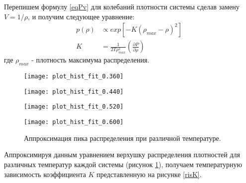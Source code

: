 Перепишем формулу \ref{eqPv} для колебаний плотности системы сделав замену $V = 1 / \rho$, и получим следующее уравнение:
\begin{equation}
\begin{aligned}
p(\rho) &\varpropto exp \left[ - K \left(\rho_{max}- \rho \right)^2 \right] \\
K &= \frac{1}{2T\rho_{max}^2} \left( \frac{\partial P}{\partial \rho} \right)
\end{aligned}
\label{eqFitRho}
\end{equation}
где $\rho_{max}$ - плотность максимума распределения.


\begin{figure}[htbp!]
\begin{center}
\begin{minipage}[h]{0.45\linewidth}
\texttt{[image: plot\_hist\_fit\_0.360]}
\end{minipage}
\begin{minipage}[h]{0.45\linewidth}
\texttt{[image: plot\_hist\_fit\_0.440]}
\end{minipage}

\begin{minipage}[h]{0.45\linewidth}
\texttt{[image: plot\_hist\_fit\_0.520]}
\end{minipage}
\begin{minipage}[h]{0.45\linewidth}
\texttt{[image: plot\_hist\_fit\_0.600]}
\end{minipage}
\caption{Аппроксимация пика распределения при различной температуре.}
\label{risHistFit}
\end{center}
\end{figure}

Аппроксимируя данным уравнением верхушку распределения плотностей для различных температур каждой системы (рисунок \ref{risHistFit}), получаем температурную зависимость коэффициента $K$ представленную на рисунке \ref{risK}.

